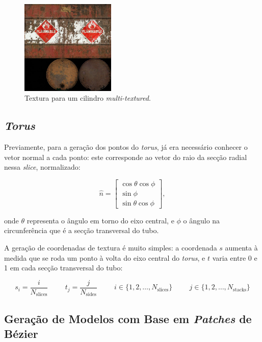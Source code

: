 \documentclass[12pt, a4paper]{article}
\begin{document}
\begin{figure}[H]
    \centering
    \includegraphics[width=0.4\textwidth]{res/phase4/Barrel.jpg}
    \caption{Textura para um cilindro \emph{multi-textured}.}
\end{figure}

\subsection{\emph{Torus}}

Previamente, para a geração dos pontos do \emph{torus}, já era necessário conhecer o vetor normal a
cada ponto: este corresponde ao vetor do raio da secção radial nessa \emph{slice}, normalizado:

$$
\hat{n} = \begin{bmatrix}
    \cos \theta \cos \phi \\
    \sin \phi \\
    \sin \theta \cos \phi
\end{bmatrix},
$$

onde $\theta$ representa o ângulo em torno do eixo central, e $\phi$ o ângulo na circunferência que
é a secção transversal do tubo.

A geração de coordenadas de textura é muito simples: a coordenada $s$ aumenta à medida que se roda
um ponto à volta do eixo central do \emph{torus}, e $t$ varia entre 0 e 1 em cada secção
transversal do tubo:

$$
s_i = \frac{i}{N_\text{slices}}
\hspace{1cm}
t_j = \frac{j}{N_\text{sides}}
\hspace{1cm}
i \in \lbrace 1, 2, \ldots, N_\text{slices} \rbrace
\hspace{1cm}
j \in \lbrace 1, 2, \ldots, N_\text{stacks} \rbrace
$$

\subsection{Geração de Modelos com Base em \emph{Patches} de Bézier}
\end{document}
